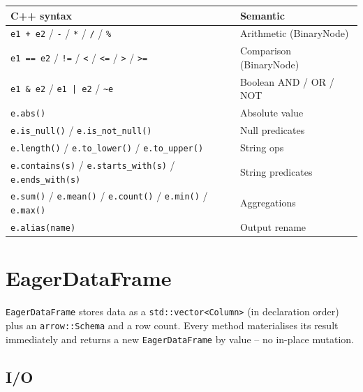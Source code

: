\documentclass[12pt,a4paper]{article}
\begin{document}
\begin{center}
\begin{tabular}{ll}
\toprule
\textbf{C++ syntax} & \textbf{Semantic} \\
\midrule
\texttt{e1 + e2} / \texttt{-} / \texttt{*} / \texttt{/} / \texttt{\%}
    & Arithmetic (BinaryNode) \\
\texttt{e1 == e2} / \texttt{!=} / \texttt{<} / \texttt{<=} / \texttt{>} / \texttt{>=}
    & Comparison (BinaryNode) \\
\texttt{e1 \& e2} / \texttt{e1 | e2} / \texttt{\textasciitilde{}e}
    & Boolean AND / OR / NOT \\
\texttt{e.abs()} & Absolute value \\
\texttt{e.is\_null()} / \texttt{e.is\_not\_null()} & Null predicates \\
\texttt{e.length()} / \texttt{e.to\_lower()} / \texttt{e.to\_upper()} & String ops \\
\texttt{e.contains(s)} / \texttt{e.starts\_with(s)} / \texttt{e.ends\_with(s)}
    & String predicates \\
\texttt{e.sum()} / \texttt{e.mean()} / \texttt{e.count()} / \texttt{e.min()} / \texttt{e.max()}
    & Aggregations \\
\texttt{e.alias(name)} & Output rename \\
\bottomrule
\end{tabular}
\end{center}

\section{EagerDataFrame}

\texttt{EagerDataFrame} stores data as a
\texttt{std::vector<Column>} (in declaration order) plus an
\texttt{arrow::Schema} and a row count.  Every method materialises its
result immediately and returns a new \texttt{EagerDataFrame} by value --
no in-place mutation.

\subsection{I/O}
\end{document}
